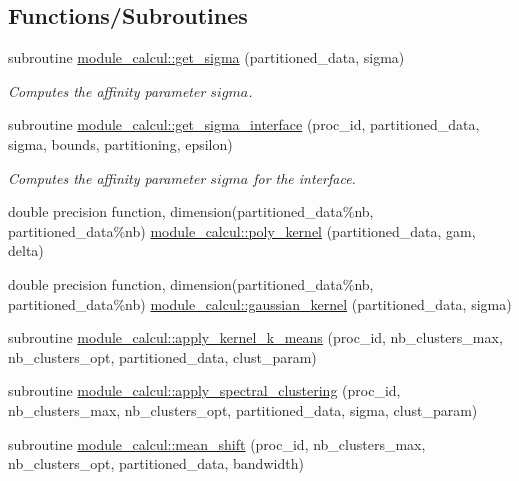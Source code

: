 \subsection*{Functions/\+Subroutines}
\begin{DoxyCompactItemize}
\item 
subroutine \hyperlink{namespacemodule__calcul_abd05b2b3ee81b4f779744a951d8a4c05}{module\+\_\+calcul\+::get\+\_\+sigma} (partitioned\+\_\+data, sigma)
\begin{DoxyCompactList}\small\item\em Computes the affinity parameter $sigma$. \end{DoxyCompactList}\item 
subroutine \hyperlink{namespacemodule__calcul_a118fd6a58b1064989fa68460457bea60}{module\+\_\+calcul\+::get\+\_\+sigma\+\_\+interface} (proc\+\_\+id, partitioned\+\_\+data, sigma, bounds, partitioning, epsilon)
\begin{DoxyCompactList}\small\item\em Computes the affinity parameter $sigma$ for the interface. \end{DoxyCompactList}\item 
double precision function, dimension(partitioned\+\_\+data\%nb, partitioned\+\_\+data\%nb) \hyperlink{namespacemodule__calcul_a97fd8d0653adb9041ab3ca899c0d0f91}{module\+\_\+calcul\+::poly\+\_\+kernel} (partitioned\+\_\+data, gam, delta)
\item 
double precision function, dimension(partitioned\+\_\+data\%nb, partitioned\+\_\+data\%nb) \hyperlink{namespacemodule__calcul_a44b26b54d1b94dddba0ba575be04658b}{module\+\_\+calcul\+::gaussian\+\_\+kernel} (partitioned\+\_\+data, sigma)
\item 
subroutine \hyperlink{namespacemodule__calcul_a72848eb89fbd2fe4a97512f53752ca5c}{module\+\_\+calcul\+::apply\+\_\+kernel\+\_\+k\+\_\+means} (proc\+\_\+id, nb\+\_\+clusters\+\_\+max, nb\+\_\+clusters\+\_\+opt, partitioned\+\_\+data, clust\+\_\+param)
\item 
subroutine \hyperlink{namespacemodule__calcul_a7bf1a318c636b4e204f267103d00114a}{module\+\_\+calcul\+::apply\+\_\+spectral\+\_\+clustering} (proc\+\_\+id, nb\+\_\+clusters\+\_\+max, nb\+\_\+clusters\+\_\+opt, partitioned\+\_\+data, sigma, clust\+\_\+param)
\item 
subroutine \hyperlink{namespacemodule__calcul_abb4a64b9f338e54274a250b9c10bf0bd}{module\+\_\+calcul\+::mean\+\_\+shift} (proc\+\_\+id, nb\+\_\+clusters\+\_\+max, nb\+\_\+clusters\+\_\+opt, partitioned\+\_\+data, bandwidth)
\end{DoxyCompactItemize}
